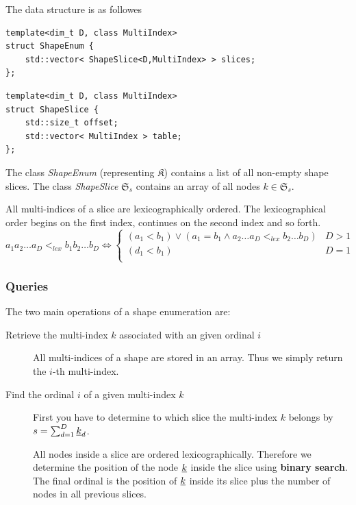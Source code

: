 \documentclass{article}
\def\classname#1{\textit{#1}}
\begin{document}
The data structure is as followes

\begin{verbatim}
template<dim_t D, class MultiIndex>
struct ShapeEnum {
    std::vector< ShapeSlice<D,MultiIndex> > slices;
};
\end{verbatim}

\begin{verbatim}
template<dim_t D, class MultiIndex>
struct ShapeSlice {
    std::size_t offset;
    std::vector< MultiIndex > table;
};
\end{verbatim}

The class \classname{ShapeEnum} (representing \(\mathfrak{K}\)) contains a list
of all non-empty shape slices. The class \classname{ShapeSlice}
\(\mathfrak{S}_s\) contains an array of all nodes \(k \in \mathfrak{S}_s\).

All multi-indices of a slice are lexicographically ordered.
The lexicographical order begins on the first index, continues on the second index and so forth.
\begin{equation}
  \label{eq:lexical_order}
  a_1a_2\dots a_D <_{lex}b_1b_2\dots b_D \iff 
  \begin{cases}
    (a_1 < b_1) \lor (a_1 = b_1 \land a_2\dots a_D <_{lex} b_2\dots b_D) & D > 1 \\
    (d_1 < b_1) & D = 1 \\
  \end{cases}
\end{equation}

\subsubsection{Queries}
The two main operations of a shape enumeration are:
\begin{description}
\item[Retrieve the multi-index \(k\) associated with an given ordinal \(i\)]\mbox{}
  \par
  All multi-indices of a shape are stored in an array.
  Thus we simply return the \(i\)-th multi-index.
\item[Find the ordinal \(i\) of a given multi-index \(k\)]\mbox{}
  \par
  First you have to determine to which slice the multi-index \(k\) belongs by
  \(s = \sum_{d=1}^D \underline{k}_d \).\par
  All nodes inside a slice are ordered lexicographically. Therefore
  we determine the position of the node \(\underline{k}\) inside the slice using \textbf{binary search}.
  The final ordinal is the position of \(\underline{k}\) inside its slice plus
  the number of nodes in all previous slices.
  
\end{description}
\end{document}
